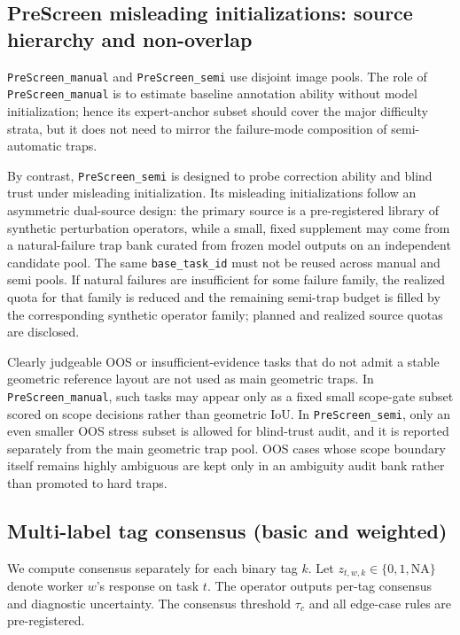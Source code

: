 \subsection{PreScreen misleading initializations: source hierarchy and non-overlap}

\texttt{PreScreen\_manual} and \texttt{PreScreen\_semi} use disjoint image pools. The role of
\texttt{PreScreen\_manual} is to estimate baseline annotation ability without model initialization; hence its
expert-anchor subset should cover the major difficulty strata, but it does not need to mirror the failure-mode
composition of semi-automatic traps.

By contrast, \texttt{PreScreen\_semi} is designed to probe correction ability and blind trust under misleading
initialization. Its misleading initializations follow an asymmetric dual-source design: the primary source is a
pre-registered library of synthetic perturbation operators, while a small, fixed supplement may come from a
natural-failure trap bank curated from frozen model outputs on an independent candidate pool. The same
\texttt{base\_task\_id} must not be reused across manual and semi pools. If natural failures are insufficient for
some failure family, the realized quota for that family is reduced and the remaining semi-trap budget is filled
by the corresponding synthetic operator family; planned and realized source quotas are disclosed.

Clearly judgeable OOS or insufficient-evidence tasks that do not admit a stable geometric reference layout are
not used as main geometric traps. In \texttt{PreScreen\_manual}, such tasks may appear only as a fixed small
scope-gate subset scored on scope decisions rather than geometric IoU. In \texttt{PreScreen\_semi}, only an even
smaller OOS stress subset is allowed for blind-trust audit, and it is reported separately from the main geometric
trap pool. OOS cases whose scope boundary itself remains highly ambiguous are kept only in an ambiguity audit bank
rather than promoted to hard traps.

\subsection{Multi-label tag consensus (basic and weighted)}
\label{sec:tag-consensus}

We compute consensus separately for each binary tag $k$. Let $z_{t,w,k}\in\{0,1,\text{NA}\}$ denote worker
$w$'s response on task $t$. The operator outputs per-tag consensus and diagnostic uncertainty. The
consensus threshold $\tau_c$ and all edge-case rules are pre-registered.


